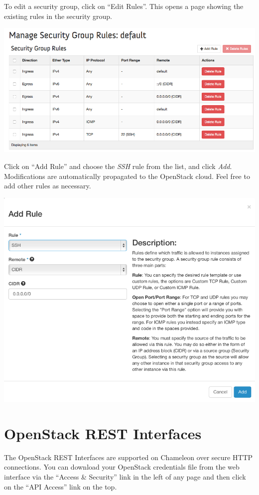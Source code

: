 To edit a security group, click on ``Edit Rules''. This opens a page
showing the existing rules in the security group.

\includegraphics[width=0.8\columnwidth]{images/chameleon/openstack_alamo_edit_rules.png}

Click on ``Add Rule'' and choose the \emph{SSH} rule from the list, and
click \emph{Add}. Modifications are automatically propagated to the
OpenStack cloud. Feel free to add other rules as necessary.

\includegraphics[width=0.8\columnwidth]{images/chameleon/openstack_alamo_add_secgroup_rule.png}

\section{OpenStack REST Interfaces}\label{openstack-rest-interfaces}

The OpenStack REST Interfaces are supported on Chameleon over secure
HTTP connections. You can download your OpenStack credentials file from
the web interface via the ``Access \& Security'' link in the left of any
page and then click on the ``API Access'' link on the top.

